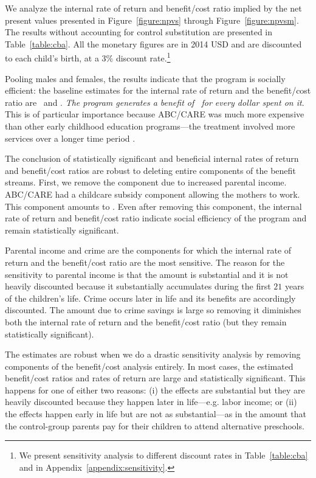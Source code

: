 We analyze the internal rate of return and benefit/cost ratio implied by the net present values presented in Figure~\ref{figure:npvs} through Figure~\ref{figure:npvsm}. The results without accounting for control substitution are presented in Table~\ref{table:cba}. All the monetary figures are in 2014 USD and are discounted to each child's birth, at a $3\%$ discount rate.\footnote{We present sensitivity analysis to different discount rates in Table~\ref{table:cba} and in Appendix~\ref{appendix:sensitivity}.}

Pooling males and females, the results indicate that the program is socially efficient: the baseline estimates for the internal rate of return and the benefit/cost ratio are \irrp\ and \bcp. \textit{The program generates a benefit of \bcp\ for every dollar spent on it}. This is of particular importance because ABC/CARE was much more expensive than other early childhood education programs---the treatment involved more services over a longer time period \citep{Elango_Hojman_etal_2016_Early-Edu}.

The conclusion of statistically significant and beneficial internal rates of return and benefit/cost ratios are robust to deleting entire components of the benefit streams. First, we remove the component due to increased parental income. ABC/CARE had a childcare subsidy component allowing the mothers to work. This component amounts to \parincomenpvp. Even after removing this component, the internal rate of return and benefit/cost ratio indicate social efficiency of the program and remain statistically significant.

Parental income and crime are the components for which the internal rate of return and the benefit/cost ratio are the most sensitive. The reason for the sensitivity to parental income is that the amount is substantial and it is not heavily discounted because it substantially accumulates during the first $21$ years of the children's life. Crime occurs later in life and its benefits are accordingly discounted. The amount due to crime savings is large so removing it diminishes both the internal rate of return and the benefit/cost ratio (but they remain statistically significant).

The estimates are robust when we do a drastic sensitivity analysis by removing components of the benefit/cost analysis entirely. In most cases, the estimated benefit/cost ratios and rates of return are large and statistically significant. This happens for one of either two reasons: (i) the effects are substantial but they are heavily discounted because they happen later in life---e.g. labor income; or (ii) the effects happen early in life but are not as substantial---as in the amount that the control-group parents pay for their children to attend alternative preschools.

